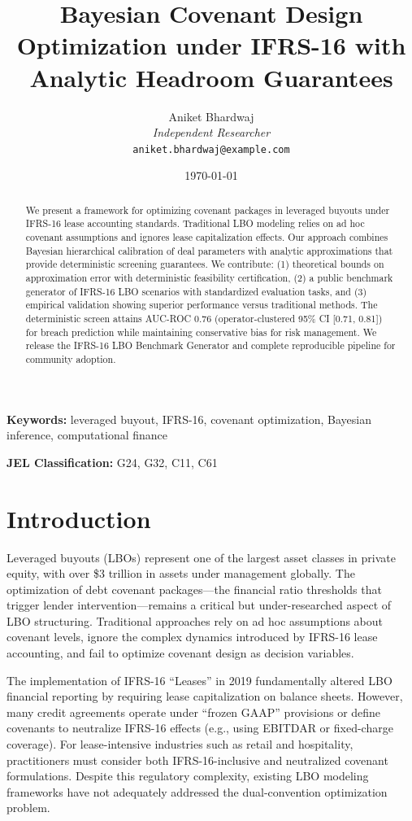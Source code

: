 \documentclass[11pt,a4paper]{article}
\title{Bayesian Covenant Design Optimization under IFRS-16 with Analytic Headroom Guarantees}
\author{
Aniket Bhardwaj\\
\textit{Independent Researcher}\\
\texttt{aniket.bhardwaj@example.com}
}
\date{\today}
\numberwithin{equation}{section}
\theoremstyle{plain}
\theoremstyle{definition}
\begin{document}
\maketitle

\begin{abstract}
We present a framework for optimizing covenant packages in leveraged buyouts under IFRS-16 lease accounting standards. Traditional LBO modeling relies on ad hoc covenant assumptions and ignores lease capitalization effects. Our approach combines Bayesian hierarchical calibration of deal parameters with analytic approximations that provide deterministic screening guarantees. We contribute: (1) theoretical bounds on approximation error with deterministic feasibility certification, (2) a public benchmark generator of IFRS-16 LBO scenarios with standardized evaluation tasks, and (3) empirical validation showing superior performance versus traditional methods. The deterministic screen attains AUC-ROC 0.76 (operator-clustered 95\% CI [0.71, 0.81]) for breach prediction while maintaining conservative bias for risk management. We release the IFRS-16 LBO Benchmark Generator and complete reproducible pipeline for community adoption.
\end{abstract}

\textbf{Keywords:} leveraged buyout, IFRS-16, covenant optimization, Bayesian inference, computational finance

\textbf{JEL Classification:} G24, G32, C11, C61

\section{Introduction}

Leveraged buyouts (LBOs) represent one of the largest asset classes in private equity, with over \$3 trillion in assets under management globally. The optimization of debt covenant packages---the financial ratio thresholds that trigger lender intervention---remains a critical but under-researched aspect of LBO structuring. Traditional approaches rely on ad hoc assumptions about covenant levels, ignore the complex dynamics introduced by IFRS-16 lease accounting, and fail to optimize covenant design as decision variables.

The implementation of IFRS-16 ``Leases'' in 2019 fundamentally altered LBO financial reporting by requiring lease capitalization on balance sheets. However, many credit agreements operate under ``frozen GAAP'' provisions or define covenants to neutralize IFRS-16 effects (e.g., using EBITDAR or fixed-charge coverage). For lease-intensive industries such as retail and hospitality, practitioners must consider both IFRS-16-inclusive and neutralized covenant formulations. Despite this regulatory complexity, existing LBO modeling frameworks have not adequately addressed the dual-convention optimization problem.
\end{document}
